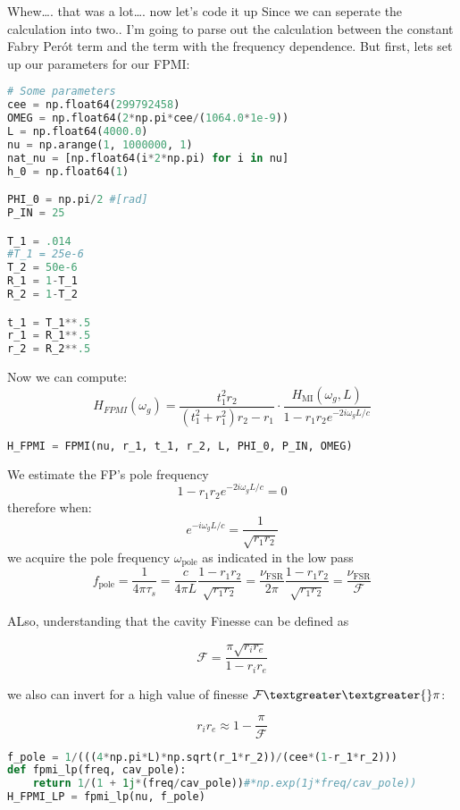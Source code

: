 Whew\ldots. that was a lot\ldots. now let's code it up Since we can
seperate the calculation into two.. I'm going to parse out the
calculation between the constant Fabry Perót term and the term with the
frequency dependence. But first, lets set up our parameters for our
FPMI:

\begin{lstlisting}[frame=single, language=Python]
# Some parameters
cee = np.float64(299792458)
OMEG = np.float64(2*np.pi*cee/(1064.0*1e-9))
L = np.float64(4000.0)
nu = np.arange(1, 1000000, 1)
nat_nu = [np.float64(i*2*np.pi) for i in nu]
h_0 = np.float64(1)

PHI_0 = np.pi/2 #[rad]
P_IN = 25

T_1 = .014
#T_1 = 25e-6 
T_2 = 50e-6
R_1 = 1-T_1
R_2 = 1-T_2

t_1 = T_1**.5
r_1 = R_1**.5
r_2 = R_2**.5
\end{lstlisting}

Now we can compute:
\[ H_{FPMI}(\omega_g) =  \frac{t_1^2r_2}{(t_1^2 + r_1^2)r_2 -r_1}\cdot \frac{H_{\mathrm{MI}}(\omega_g, L)}{1-r_1r_2e^{-2i \omega_g L /c }}  \]

\begin{lstlisting}[frame=single, language=Python]
H_FPMI = FPMI(nu, r_1, t_1, r_2, L, PHI_0, P_IN, OMEG)
\end{lstlisting}

We estimate the FP's pole frequency
\[  1 - r_1 r_2 e^{-2i \omega_g L / c} = 0 \] therefore when:
\[ e^{-i \omega_g L / c} = \frac{1}{\sqrt{r_1 r_2}} \] we acquire the
pole frequency \(\omega_\mathrm{pole}\) as indicated in the low pass
\[ f_\mathrm{pole} = \frac{1}{4\pi \tau_{s}} =  \frac{c}{4 \pi L} \frac{1- r_1 r_2}{\sqrt{r_1 r_2}} = \frac{\nu_\mathrm{FSR}}{2 \pi} \frac{1- r_1 r_2}{\sqrt{r_1 r_2}} = \frac{\nu_\mathrm{FSR}}{\mathcal{F}} \]

ALso, understanding that the cavity Finesse can be defined as

\[ \mathcal{F} = \frac{\pi \sqrt{r_i r_e}}{1- r_i r_e} \]

we also can invert for a high value of finesse $ \mathcal{F} \textgreater\textgreater{} \pi $:

\[ r_i r_e \approx 1 - \frac{\pi}{\mathcal{F}} \]

\begin{lstlisting}[frame=single, language=Python]
f_pole = 1/(((4*np.pi*L)*np.sqrt(r_1*r_2))/(cee*(1-r_1*r_2)))
def fpmi_lp(freq, cav_pole):
    return 1/(1 + 1j*(freq/cav_pole))#*np.exp(1j*freq/cav_pole))
H_FPMI_LP = fpmi_lp(nu, f_pole)
\end{lstlisting}

